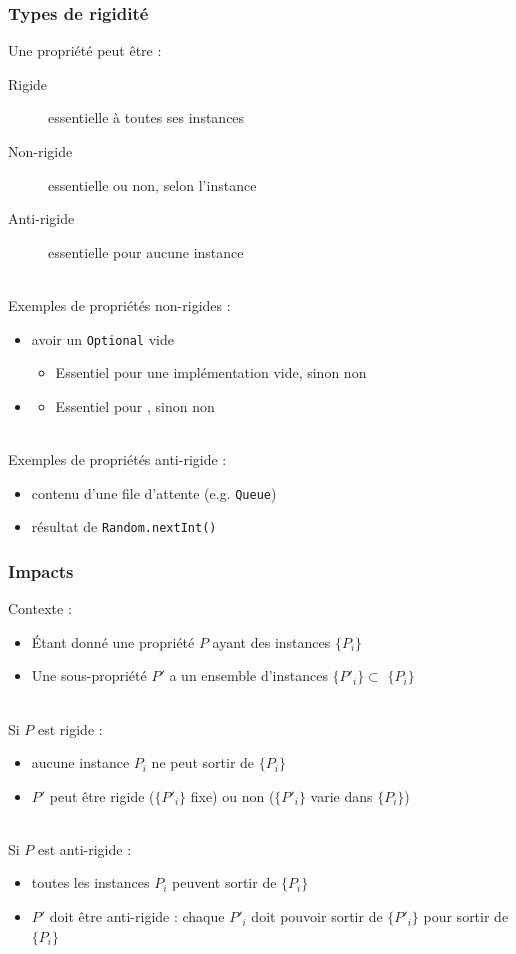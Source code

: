 \documentclass[draft]{beamer}
\DeclareRobustCommand{\todo}[1]{\ifdraft{\textbf{\textcolor{red}{[#1]}}}{}}
\begin{document}
\begin{frame}
\frametitle{Types de rigidité}
Une propriété peut être :
\begin{description}
 \item[Rigide] essentielle à toutes ses instances
 \item[Non-rigide] essentielle ou non, selon l'instance
 \item[Anti-rigide] essentielle pour aucune instance
\end{description}
~\\
Exemples de propriétés non-rigides :
\begin{itemize}
 \item avoir un \lstinline{Optional} vide
 \begin{itemize}
  \item Essentiel pour une implémentation vide, sinon non
 \end{itemize}
 \item \todo{...}
 \begin{itemize}
  \item Essentiel pour \todo{...}, sinon non
 \end{itemize}
\end{itemize}
~\\
Exemples de propriétés anti-rigide :
\begin{itemize}
 \item contenu d'une file d'attente (e.g. \lstinline{Queue})
 \item résultat de \lstinline{Random.nextInt()}
\end{itemize}
\end{frame}

\begin{frame}
\frametitle{Impacts}
\def\pa{$P$\xspace}
\def\pb{$P'$\xspace}
\def\ca{$\{P_i\}$\xspace}
\def\cb{$\{P'_i\}$\xspace}
\def\ia{$P_i$\xspace}
\def\ib{$P'_i$\xspace}
Contexte :
\begin{itemize}
 \item Étant donné une propriété \pa ayant des instances \ca
 \item Une sous-propriété \pb a un ensemble d'instances \cb $\subset$ \ca
\end{itemize}
~\\
Si \pa est rigide :
\begin{itemize}
 \item aucune instance \ia ne peut sortir de \ca
 \item \pb peut être rigide (\cb fixe) ou non (\cb varie dans \ca)
\end{itemize}
~\\
Si \pa est anti-rigide :
\begin{itemize}
 \item toutes les instances \ia peuvent sortir de \ca
 \item \pb doit être anti-rigide : chaque \ib doit pouvoir sortir de \cb pour sortir de \ca
\end{itemize}
\end{frame}
\end{document}
